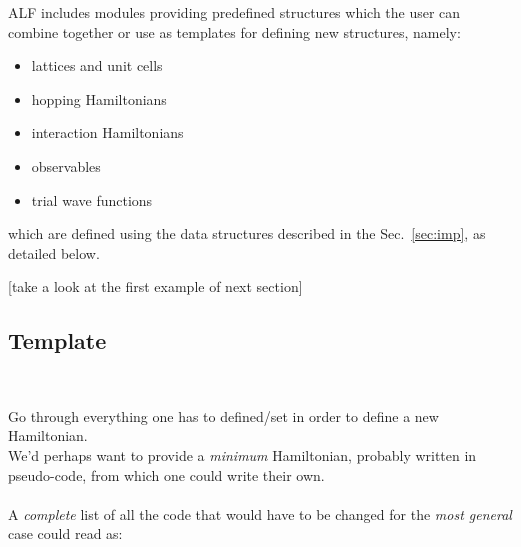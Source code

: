 

ALF includes modules providing predefined structures which the user can combine together or use as templates for defining new structures, namely: 
\begin{itemize}
	\item lattices and unit cells
	\item hopping Hamiltonians
	\item interaction Hamiltonians
	\item observables
	\item trial wave functions
\end{itemize}
which are defined using the data structures described in the Sec.~\ref{sec:imp}, as detailed below.

[take a look at the first example of next section]


\subsection{Template}

\\
	

  Go through everything one has to defined/set in order to define a new Hamiltonian. \\

We'd perhaps want to provide a \emph{minimum} Hamiltonian, probably written in pseudo-code, from which one could write their own.\\ \\

\noindent A \emph{complete} list of all the code that would have to be changed for the \emph{most general} case could read as:

